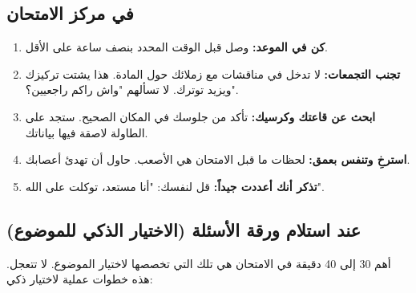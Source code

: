 \documentclass[12pt,a4paper]{book}
\begin{document}
	\subsection{في مركز الامتحان}
	\begin{enumerate}
		\item \textbf{كن في الموعد:} وصل قبل الوقت المحدد بنصف ساعة على الأقل.
		\item \textbf{تجنب التجمعات:} لا تدخل في مناقشات مع زملائك حول المادة. هذا يشتت تركيزك ويزيد توترك. لا تسألهم "واش راكم راجعيين؟".
		\item \textbf{ابحث عن قاعتك وكرسيك:} تأكد من جلوسك في المكان الصحيح. ستجد على الطاولة لاصقة فيها بياناتك.
		\item \textbf{استرخِ وتنفس بعمق:} لحظات ما قبل الامتحان هي الأصعب. حاول أن تهدئ أعصابك.
		\item \textbf{تذكر أنك أعددت جيداً:} قل لنفسك: "أنا مستعد، توكلت على الله".
	\end{enumerate}
	
	\subsection{عند استلام ورقة الأسئلة (الاختيار الذكي للموضوع)}
	أهم 30 إلى 40 دقيقة في الامتحان هي تلك التي تخصصها لاختيار الموضوع. لا تتعجل. هذه خطوات عملية لاختيار ذكي:
	
\end{document}
